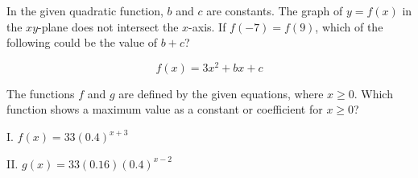 \vspace{0.75em}


\vspace{2em}

\noindent\markforreview
\vspace{1em}

In the given quadratic function, $b$ and $c$ are constants. The graph of $y = f(x)$ in the $xy$-plane does not intersect the $x$-axis. If $f(-7) = f(9)$, which of the following could be the value of $b + c$?

\[
f(x) = 3x^2 + bx + c
\]

\vspace{0.75em}


\vspace{2em}

\noindent\markforreview
\vspace{1em}

The functions $f$ and $g$ are defined by the given equations, where $x \geq 0$. Which function shows a maximum value as a constant or coefficient for $x \geq 0$?

\vspace{0.5em}

I. $f(x) = 33(0.4)^{x + 3}$

II. $g(x) = 33(0.16)(0.4)^{x - 2}$

\vspace{0.75em}


